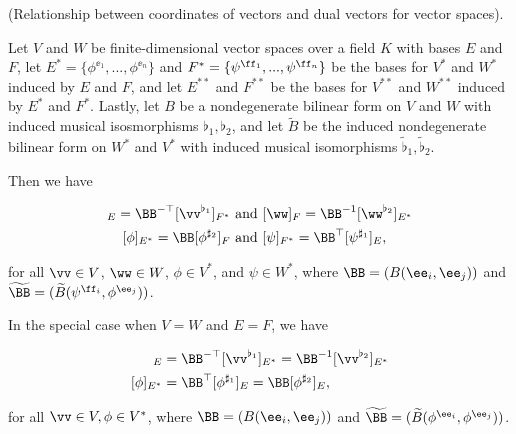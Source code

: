 \begin{theorem}
\label{ch::bilinear_forms_metric_tensors::thm::vectors_dual_vectors_metric_tensor}

    (Relationship between coordinates of vectors and dual vectors for vector spaces).
    
    Let $V$ and $W$ be finite-dimensional vector spaces over a field $K$ with bases $E$ and $F$, let $E^* = \{\phi^{\ee_1}, ..., \phi^{\ee_n}\}$ and $F^* = \{\psi^{\ff_1}, ..., \psi^{\ff_n}\}$ be the bases for $V^*$ and $W^*$ induced by $E$ and $F$, and let $E^{**}$ and $F^{**}$ be the bases for $V^{**}$ and $W^{**}$ induced by $E^*$ and $F^*$. Lastly, let $B$ be a nondegenerate bilinear form on $V$ and $W$ with induced musical isosmorphisms $\flat_1, \flat_2$, and let $\widetilde{B}$ be the induced nondegenerate bilinear form on $W^*$ and $V^*$ with induced musical isomorphisms $\widetilde{\flat}_1, \widetilde{\flat}_2$. 

    Then we have
    
    \begin{align*}
        [\vv]_E = \BB^{-\top} [\vv^{\flat_1}]_{F^*} &\text{ and }
        [\ww]_F = \BB^{-1} [\ww^{\flat_2}]_{E^*} \\
        [\phi]_{E^*} = \BB [\phi^{\sharp_2}]_F &\text{ and }
        [\psi]_{F^*} = \BB^\top [\psi^{\sharp_1}]_E,
    \end{align*}
    
    for all $\vv \in V$, $\ww \in W$, $\phi \in V^*$, and $\psi \in W^*$, where $\BB = (B(\ee_i, \ee_j))$ and $\widetilde{\BB} = (\widetilde{B}(\psi^{\ff_i}, \phi^{\ee_j}))$.

    \vspace{.25cm}

    In the special case when $V = W$ and $E = F$, we have

    \begin{align*}
        [\vv]_E &= \BB^{-\top} [\vv^{\flat_1}]_{E^*} = \BB^{-1} [\vv^{\flat_2}]_{E^*} \\
        [\phi]_{E^*} &= \BB^\top [\phi^{\sharp_1}]_E = \BB [\phi^{\sharp_2}]_E,
    \end{align*}

    for all $\vv \in V, \phi \in V^*$, where $\BB = (B(\ee_i, \ee_j))$ and $\widetilde{\BB} = (\widetilde{B}(\phi^{\ee_i}, \phi^{\ee_j}))$.
\end{theorem}

